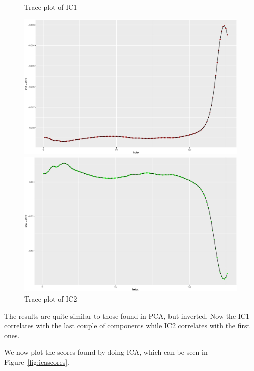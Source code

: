\documentclass[a4paper,12pt]{article}
\begin{document}
        \begin{figure}[H]
            \centering
            \begin{minipage}[]{0.49\textwidth}
                \caption{Trace plot of IC1\label{fig:x750ical}}
                \includegraphics[width=\textwidth]{share/A2_trace_ICA1.eps}
            \end{minipage}
            \begin{minipage}[]{0.49\textwidth}
                \caption{Trace plot of IC2\label{fig:x752ical}}
                \includegraphics[width=\textwidth]{share/A2_trace_ICA2.eps}
            \end{minipage}
        \end{figure}

        The results are quite similar to those found in PCA, but inverted. Now the IC1 correlates with the last couple of components while IC2 correlates with the first ones.

        We now plot the scores found by doing ICA, which can be seen in Figure~\ref{fig:icascores}.
\end{document}
